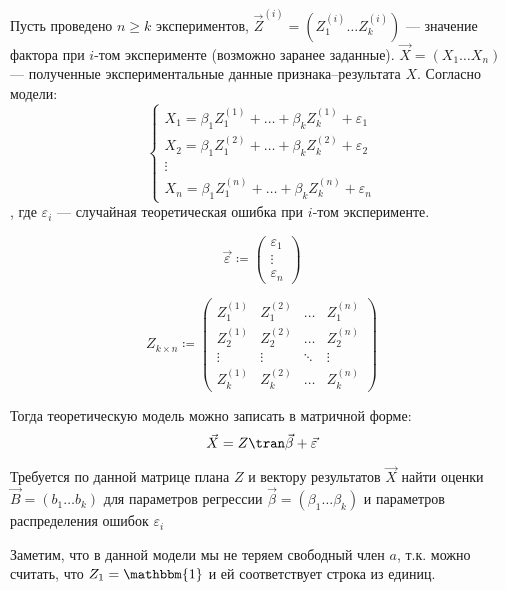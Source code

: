 Пусть проведено \(n \geq k\) экспериментов, \(\vec{Z}^{(i)} = (Z_1^{(i)} \dots Z_k^{(i)})\) --- значение фактора при \(i\)-том эксперименте (возможно заранее заданные). \(\vec{X} = (X_1 \dots X_n)\) --- полученные экспериментальные данные признака--результата \(X\). Согласно модели:
\[\begin{cases}
        X_1 = \beta_1 Z_1^{(1)} + \dots + \beta_k Z_k^{(1)} + \varepsilon_1 \\
        X_2 = \beta_1 Z_1^{(2)} + \dots + \beta_k Z_k^{(2)} + \varepsilon_2 \\
        \vdots                                                              \\
        X_n = \beta_1 Z_1^{(n)} + \dots + \beta_k Z_k^{(n)} + \varepsilon_n
    \end{cases}\]
, где \(\varepsilon_i\) --- случайная теоретическая ошибка при \(i\)-том эксперименте.
\begin{notation}
    \[\vec{\varepsilon} \coloneqq \begin{pmatrix}
            \varepsilon_1 \\
            \vdots        \\
            \varepsilon_n
        \end{pmatrix}\]
\end{notation}
\begin{notation}
    \[Z_{k \times n} \coloneqq \begin{pmatrix}
            Z_1^{(1)} & Z_1^{(2)} & \dots  & Z_1^{(n)} \\
            Z_2^{(1)} & Z_2^{(2)} & \dots  & Z_2^{(n)} \\
            \vdots    & \vdots    & \ddots & \vdots    \\
            Z_k^{(1)} & Z_k^{(2)} & \dots  & Z_k^{(n)}
        \end{pmatrix}\]
\end{notation}

Тогда теоретическую модель можно записать в матричной форме:
\[\vec{X} = Z\tran \vec{\beta} + \vec{\varepsilon}\]

Требуется по данной матрице плана \(Z\) и вектору результатов \(\vec{X}\) найти оценки \(\vec{B} = (b_1 \dots b_k)\) для параметров регрессии \(\vec{\beta} = (\beta_1 \dots \beta_k)\) и параметров распределения ошибок \(\varepsilon_i\)

\begin{remark}
    Заметим, что в данной модели мы не теряем свободный член \(a\), т.к. можно считать, что \(Z_1 = \mathbbm{1}\) и ей соответствует строка из единиц.
\end{remark}

